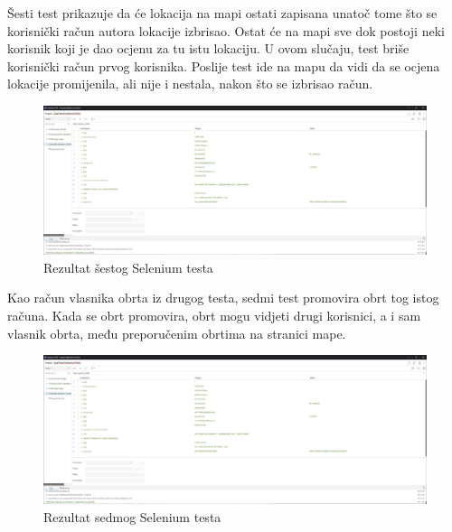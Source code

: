         \textbf{}{Šesti test prikazuje da će lokacija na mapi ostati zapisana unatoč tome što se korisnički račun autora lokacije izbrisao. Ostat će na mapi sve dok postoji neki korisnik koji je dao ocjenu za tu istu lokaciju. U ovom slučaju, test briše korisnički račun prvog korisnika. Poslije test ide na mapu da vidi da se ocjena lokacije promijenila, ali nije i nestala, nakon što se izbrisao račun.}

        \begin{figure}[H]
			    \includegraphics[width=\textwidth]{slike/passed-selenium6.png} 
			        \caption{Rezultat šestog Selenium testa}
			    \label{fig:Rezultat šestog Selenium testa}
		\end{figure}

        \textbf{}{Kao račun vlasnika obrta iz drugog testa, sedmi test promovira obrt tog istog računa. Kada se obrt promovira, obrt mogu vidjeti drugi korisnici, a i sam vlasnik obrta, među preporučenim obrtima na stranici mape.}

        \begin{figure}[H]
			    \includegraphics[width=\textwidth]{slike/passed-selenium6.png} 
			        \caption{Rezultat sedmog Selenium testa}
			    \label{fig:Rezultat sedmog Selenium testa}
		\end{figure}


















